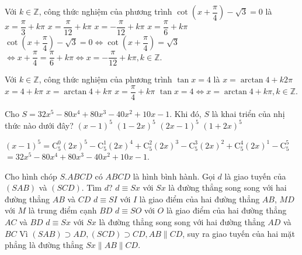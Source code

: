 \begin{ex}%
Với $k \in \mathbb{Z}$, công thức nghiệm của phương trình $\cot\left(x+\dfrac{\pi}{4}\right)-\sqrt{3} = 0$ là
 \choice
  {$x = \dfrac{\pi}{3}+k\pi$}
  {$x = \dfrac{\pi}{12}+k\pi$}
  {\True $x = -\dfrac{\pi}{12}+k\pi$}
  {$x = \dfrac{\pi}{6}+k\pi$}
 \loigiai
 {$\cot\left(x+\dfrac{\pi}{4}\right)-\sqrt{3} = 0 \Leftrightarrow \cot {\left(x+\dfrac{\pi}{4}\right)}=\sqrt{3}$ \\
 $\Leftrightarrow x+\dfrac{\pi}{4}=\dfrac{\pi}{6}+k\pi \Leftrightarrow x=-\dfrac{\pi}{12}+k\pi,k\in \mathbb{Z}$.
 }
\end{ex}

\begin{ex}%
Với $k \in \mathbb{Z}$, công thức nghiệm của phương trình $\tan{x} = 4$ là
 \choice
  {$x = \arctan 4 + k2\pi$}
  {$x = 4+k\pi$}
  {\True $x=\arctan 4+k\pi$}
  {$x = \dfrac{\pi}{4}+k\pi$}
 \loigiai
 {$\tan{x} = 4 \Leftrightarrow x = \arctan{4}+k\pi,k \in \mathbb{Z}$. 
 }
\end{ex}


\begin{ex}%
 Cho $S=32x^5-80x^4+80x^3-40x^2+10x-1$. Khi đó, $S$ là khai triển của nhị thức nào dưới đây?
 \choice
  {$\left( x-1 \right)^5$}
  {$\left( 1-2x \right)^5$}
  {\True $\left( 2x-1 \right)^5$}
  {$\left( 1+2x \right)^5$}
 \loigiai
 {$\left( x-1 \right)^5 = \mathrm{C}_5^0\left(2x\right)^5-\mathrm{C}_5^1\left(2x\right)^4+\mathrm{C}_5^2\left(2x\right)^3-\mathrm{C}_5^3\left(2x\right)^2+\mathrm{C}_5^4\left(2x\right)^1-\mathrm{C}_5^5$\\
 $=32x^5-80x^4+80x^3-40x^2+10x-1$.

 }
\end{ex}

\begin{ex}%
 Cho hình chóp $S.ABCD$ có $ABCD$ là hình bình hành. Gọi $d$ là giao tuyến của $(SAB)$ và $(SCD)$. Tìm $d$?
 \choice
  {\True $d \equiv Sx$ với $Sx$ là đường thẳng song song với hai đường thẳng $AB$ và $CD$}
  {$d \equiv SI$ với $I$ là giao điểm của hai đường thẳng $AB$, $MD$ với $M$ là trung điểm cạnh $BD$}
  {$d \equiv SO$ với $O$ là giao điểm của hai đường thẳng $AC$ và $BD$}
  {$d \equiv Sx$ với $Sx$ là đường thẳng song song với hai đường thẳng $AD$ và $BC$}
 \loigiai
 {Vì $(SAB)\supset AD, (SCD) \supset CD, AB \parallel CD$, suy ra giao tuyến của hai mặt phẳng là đường thẳng $Sx \parallel AB \parallel CD$.
  }
\end{ex}

